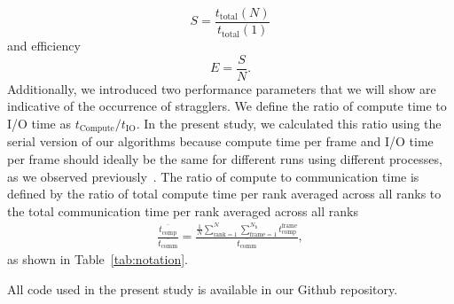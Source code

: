 \begin{equation}
  \label{eq:speedup}
  S = \frac{t_{\text{total}}(N)}{t_{\text{total}}(1)}
\end{equation}
and efficiency
\begin{equation}
  \label{eq:efficiency}
  E = \frac{S}{N}.
\end{equation}
Additionally, we introduced two performance parameters that we will show are indicative of the occurrence of stragglers.
We define the ratio of compute time to I/O time as $t_{\text{Compute}}/t_{\text{IO}}$. 
In the present study, we calculated this ratio using the serial version of our algorithms because compute time per frame and I/O time per frame should ideally be the same for different runs using different processes, as we observed previously~\cite{Khoshlessan:2017ab}.
The ratio of compute to communication time is defined by the ratio of total compute time per rank averaged across all ranks to the total communication time per rank averaged across all ranks 
\begin{gather}
  \label{eq:Compute-comm}
  \frac{\overline{t_{\text{comp}}}}{\overline{t_{\text{comm}}}} = \frac{\frac{1}{N}
    \sum_{\text{rank}=1}^{N} \sum_{\text{frame}=1}^{N_{\text{b}}}t_{\text{comp}}^{\text{frame}}}%
  {\overline{t_{\text{comm}}}},
\end{gather}
as shown in Table~\ref{tab:notation}.
 
All code used in the present study is available in our Github repository. 
 
